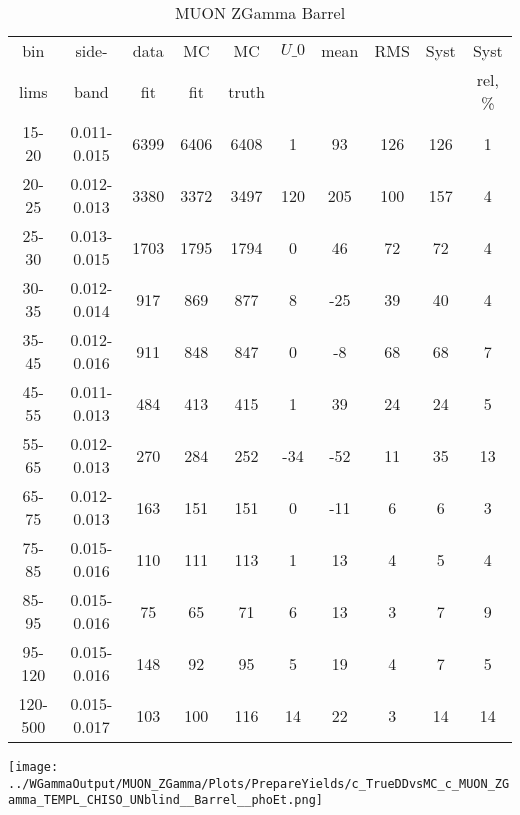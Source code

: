 \documentclass{beamer}
\begin{document}
\begin{frame}
{
\begin{table}[h]
  	\tiny
  \begin{center}
  \caption{MUON ZGamma Barrel}
  \begin{tabular}{|c|c|c|c|c|c|c|c|c|c|}
    bin & side- & data & MC & MC    & $U\_{0}$ & mean & RMS & Syst & Syst \\ 
    lims & band & fit & fit & truth &       &      &     &      & rel, \% \\ \hline
    15-20 & 0.011-0.015 & 6399 & 6406 & 6408 & 1 & 93 & 126 & 126 & 1  \\ \hline
    20-25 & 0.012-0.013 & 3380 & 3372 & 3497 & 120 & 205 & 100 & 157 & 4  \\ \hline
    25-30 & 0.013-0.015 & 1703 & 1795 & 1794 & 0 & 46 & 72 & 72 & 4  \\ \hline
    30-35 & 0.012-0.014 & 917 & 869 & 877 & 8 & -25 & 39 & 40 & 4  \\ \hline
    35-45 & 0.012-0.016 & 911 & 848 & 847 & 0 & -8 & 68 & 68 & 7  \\ \hline
    45-55 & 0.011-0.013 & 484 & 413 & 415 & 1 & 39 & 24 & 24 & 5  \\ \hline
    55-65 & 0.012-0.013 & 270 & 284 & 252 & -34 & -52 & 11 & 35 & 13  \\ \hline
    65-75 & 0.012-0.013 & 163 & 151 & 151 & 0 & -11 & 6 & 6 & 3  \\ \hline
    75-85 & 0.015-0.016 & 110 & 111 & 113 & 1 & 13 & 4 & 5 & 4  \\ \hline
    85-95 & 0.015-0.016 & 75 & 65 & 71 & 6 & 13 & 3 & 7 & 9  \\ \hline
    95-120 & 0.015-0.016 & 148 & 92 & 95 & 5 & 19 & 4 & 7 & 5  \\ \hline
    120-500 & 0.015-0.017 & 103 & 100 & 116 & 14 & 22 & 3 & 14 & 14  \\ \hline
  \end{tabular}
  \label{tab:systSbVar_Meth1_MUON_ZGamma_Barrel}
  \end{center}
\end{table}

\texttt{[image: ../WGammaOutput/MUON\_ZGamma/Plots/PrepareYields/c\_TrueDDvsMC\_c\_MUON\_ZGamma\_TEMPL\_CHISO\_UNblind\_\_Barrel\_\_phoEt.png]} 

}
\end{frame}
\end{document}
